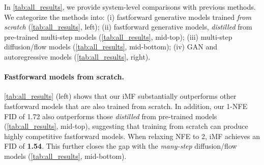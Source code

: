 In \cref{tab:all_results}, we provide system-level comparisons with previous methods. We categorize the methods into:
(i) fastforward generative models trained \textit{from scratch} (\cref{tab:all_results}, left); 
(ii) fastforward generative models, \textit{distilled} from pre-trained multi-step models (\cref{tab:all_results}, mid-top); 
(iii) multi-step diffusion/flow models (\cref{tab:all_results}, mid-bottom); (iv) GAN and autoregressive models (\cref{tab:all_results}, right). 

\paragraph{Fastforward models from scratch.} \cref{tab:all_results} (left) shows that our iMF substantially outperforms other fastforward models that are also trained from scratch. 
In addition, our 1-NFE FID of 1.72 also outperforms those \textit{distilled} from pre-trained models (\cref{tab:all_results}, mid-top), suggesting that training from scratch can produce highly competitive fastforward models.
When relaxing NFE to 2, iMF achieves an FID of \textbf{1.54}. This further closes the gap with the \textit{many-step} diffusion/flow models (\cref{tab:all_results}, mid-bottom).
